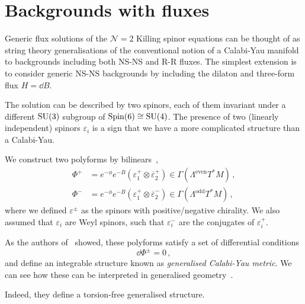 \documentclass[debug]{phd}
\begin{document}
		\section{Backgrounds with fluxes}
				Generic flux solutions of the $\mathcal{N} = 2$ Killing spinor equations can be thought of as string theory generalisations of the conventional notion of a Calabi-Yau manifold to backgrounds including both NS-NS and R-R fluxes. 
				The simplest extension is to consider generic NS-NS backgrounds by including the dilaton and three-form flux $H = \dd B$.
				
				The solution can be described by two spinors, each of them invariant under a different $\mathrm{SU}(3)$ subgroup of $\mathrm{Spin}(6) \cong \mathrm{SU}(4)$.
				The presence of two (linearly independent) spinors $\varepsilon_i$ is a sign that we have a more complicated structure than a Calabi-Yau.
				
				We construct two polyforms by bilinears~\cite{petrini1},
						\begin{equation}
							\begin{split}
								\Phi^{+} & = e^{-\phi} e^{-B} \left(\varepsilon_1^+ \otimes \overline{\varepsilon}_2^+\right) \in \Gamma (\Lambda^{\mathrm{even}} T^*M) \, , \\
								\Phi^{-} & = e^{-\phi} e^{-B} \left(\varepsilon_1^+ \otimes \overline{\varepsilon}_2^-\right) \in \Gamma (\Lambda^{\mathrm{odd}} T^*M) \, ,
							\end{split}
						\end{equation}
				where we defined $\varepsilon^\pm$ as the spinors with positive/negative chirality.
				We also assumed that $\varepsilon_i$ are Weyl spinors, such that $\varepsilon_i^-$ are the conjugates of $\varepsilon_i^+$.
				
				As the authors of~\cite{petrini1} showed, these polyforms satisfy a set of differential conditions
						\begin{equation}
								\dd \Phi^{\pm} = 0\, ,
						\end{equation}
				and define an integrable structure known as \emph{generalised Calabi-Yau metric}.
				We can see how these can be interpreted in generalised geometry~\cite{petrini1, petrini2}.
				
				Indeed, they define a torsion-free generalised structure.
				
\end{document}
